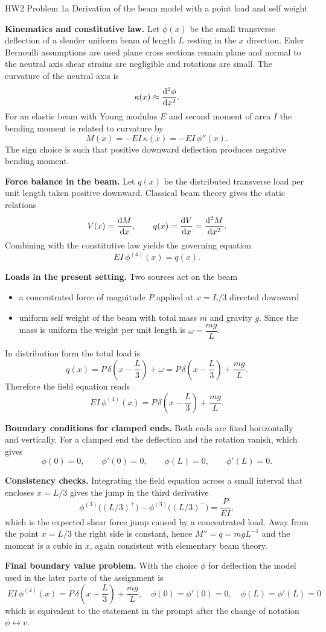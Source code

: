 \documentclass[11pt]{article}
\begin{document}
\begin{center}
{\Large HW2 Problem 1a  Derivation of the beam model with a point load and self weight}\\
\end{center}

\textbf{Kinematics and constitutive law.}
Let $\phi(x)$ be the small transverse deflection of a slender uniform beam of length $L$ resting in the $x$ direction.
Euler Bernoulli assumptions are used
plane cross sections remain plane and normal to the neutral axis
shear strains are negligible
and rotations are small.
The curvature of the neutral axis is
\[
\kappa(x) \approx \dv[2]{\phi}{x}.
\]
For an elastic beam with Young modulus $E$ and second moment of area $I$ the bending moment is related to curvature by
\[
M(x) = - E I \, \kappa(x) = - E I \, \phi''(x).
\]
The sign choice is such that positive downward deflection produces negative bending moment.

\textbf{Force balance in the beam.}
Let $q(x)$ be the distributed transverse load per unit length taken positive downward.
Classical beam theory gives the static relations
\[
V(x) = \dv{M}{x}, 
\qquad 
q(x) = \dv{V}{x} = \dv[2]{M}{x}.
\]
Combining with the constitutive law yields the governing equation
\[
E I \, \phi^{(4)}(x) = q(x).
\]

\textbf{Loads in the present setting.}
Two sources act on the beam
\begin{itemize}
\item a concentrated force of magnitude $P$ applied at $x = L/3$ directed downward
\item uniform self weight of the beam with total mass $m$ and gravity $g$.  
Since the mass is uniform the weight per unit length is $\omega = \dfrac{m g}{L}$.
\end{itemize}
In distribution form the total load is
\[
q(x) = P\,\delta\!\left(x-\frac{L}{3}\right) + \omega
= P\,\delta\!\left(x-\frac{L}{3}\right) + \frac{m g}{L}.
\]
Therefore the field equation reads
\[
E I \, \phi^{(4)}(x) 
= P\,\delta\!\left(x-\frac{L}{3}\right) + \frac{m g}{L}.
\]

\textbf{Boundary conditions for clamped ends.}
Both ends are fixed horizontally and vertically.  
For a clamped end the deflection and the rotation vanish, which gives
\[
\phi(0)=0, 
\qquad 
\phi'(0)=0,
\qquad
\phi(L)=0,
\qquad
\phi'(L)=0.
\]

\textbf{Consistency checks.}
Integrating the field equation across a small interval that encloses $x=L/3$ gives the jump in the third derivative
\[
\phi^{(3)}\bigl((L/3)^{+}\bigr) - \phi^{(3)}\bigl((L/3)^{-}\bigr)
= \frac{P}{E I},
\]
which is the expected shear force jump caused by a concentrated load.
Away from the point $x=L/3$ the right side is constant, hence $M'' = q = m g L^{-1}$ and the moment is a cubic in $x$, again consistent with elementary beam theory.

\textbf{Final boundary value problem.}
With the choice $\phi$ for deflection the model used in the later parts of the assignment is
\[
\boxed{ \;
E I \, \phi^{(4)}(x) 
= P\,\delta\!\left(x-\frac{L}{3}\right) + \frac{m g}{L},
\quad
\phi(0)=\phi'(0)=0,
\quad
\phi(L)=\phi'(L)=0
\;}
\]
which is equivalent to the statement in the prompt after the change of notation $\phi \leftrightarrow v$.
\end{document}
